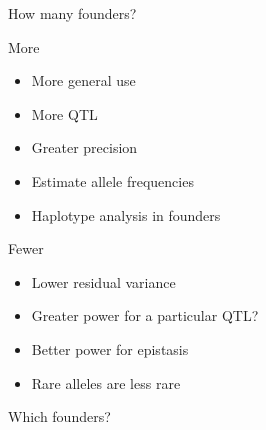 \documentclass[12pt]{article}
\newcommand{\headsize}{\fontsize{35}{35} \selectfont}
\newcommand{\smallsize}{\fontsize{25}{30} \selectfont}
\newcommand{\smallersize}{\fontsize{20}{25} \selectfont}
\begin{document}
\headsize \color{myyellow}
\hfill \begin{minipage}{5.75in}
\centering
How many founders?
\end{minipage}

\vspace{25mm}

\color{mywhite}
\smallersize

\hspace{0.5in} \begin{minipage}[t]{4.8in}
\vspace*{0mm}

\hspace*{0.5in} {\color{myblue} \smallsize More}

\vspace{6mm}

\begin{itemize}
\itemsep16pt
\item More general use
\item More QTL
\item Greater precision
\item Estimate allele frequencies
\item Haplotype analysis in founders
\end{itemize}

\end{minipage}
\hfill
\begin{minipage}[t]{4.8in}
\vspace*{0mm}

\hspace*{0.5in} {\color{myblue} \smallsize Fewer}

\vspace{6mm}

\begin{itemize}
\itemsep16pt
\item Lower residual variance
\item Greater power for a particular QTL?
\item Better power for epistasis
\item Rare alleles are less rare
\end{itemize}

\end{minipage}

\newpage


\headsize \color{myyellow}
\hfill \begin{minipage}{5.75in}
\centering
Which founders?
\end{minipage}
\end{document}
